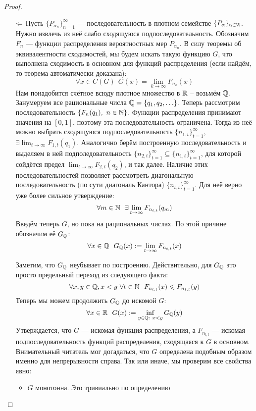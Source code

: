 \begin{proof}
\begin{itemize}
        \item[$\Leftarrow$] Пусть $\{P_{\alpha_n}\}_{n = 1}^\infty$ --- последовательность в плотном семействе $\{P_\alpha\}_{\alpha \in \mathfrak{A}}$. Нужно извлечь из неё слабо сходящуюся подпоследовательность. Обозначим $F_n$ --- функции распределения вероятностных мер $P_{\alpha_n}$. В силу теоремы об эквивалентности сходимостей, мы будем искать такую функцию $G$, что выполнена сходимость в основном для функций распределения (если найдём, то теорема автоматически доказана):
        \[
            \forall x \in C(G)\ \ G(x) = \lim_{k \to \infty} F_{n_k}(x)
        \]
        Нам понадобится счётное всюду плотное множество в $\mathbb{R}$ -- возьмём $\mathbb{Q}$. Занумеруем все рациональные числа $\mathbb{Q} = \{q_1, q_2, \ldots\}$. Теперь рассмотрим последовательность $\{F_n(q_1),\ n \in \mathbb{N}\}$. Функции распределения принимают значения на $[0, 1]$, поэтому эта последовательность ограничена. Тогда из неё можно выбрать сходящуюся подпоследовательность $\{n_{1, t}\}_{t = 1}^\infty$, $\exists \lim_{t \to \infty} F_{1, t}(q_1)$. Аналогично берём построенную последовательность и выделяем в ней подполедовательность $\{n_{2, t}\}_{t = 1}^\infty \subseteq \{n_{1, t}\}_{t = 1}^\infty$, для которой сойдётся предел $\lim_{t \to \infty} F_{2, t}(q_2)$, и так далее. Наличие этих последовательностей позволяет рассмотреть диагональную последовательность (по сути диагональ Кантора) $\{n_{t, t}\}_{t = 1}^\infty$. Для неё верно уже более сильное утверждение:
        \[
        	\forall m \in \mathbb{N}\ \ \exists \lim_{t \to \infty} F_{n_{t, t}}(q_m)
        \]
        Введём теперь $G$, но пока на рациональных числах. По этой причине обозначим её $G_{\mathbb{Q}}$:
        \[
            \forall x \in \mathbb{Q}\ \ G_{\mathbb{Q}}(x) := \lim_{t \to \infty} F_{n_{t, t}}(x)
        \]

        Заметим, что $G_{\mathbb{Q}}$ неубывает по построению. Действительно, для $G_{\mathbb{Q}}$ это просто предельный переход из следующего факта:
        \[
        	\forall x, y \in \Q, x < y\ \forall t \in \N\ \ F_{n_{t, t}}(x) \le F_{n_{t, t}}(y)
        \]
		Теперь мы можем продолжить $G_{\mathbb{Q}}$ до искомой $G$:
        \[
            \forall x \in \mathbb{R}\ \ G(x) := \inf_{y \in \mathbb{Q} \colon x < y} G_{\mathbb{Q}}(y)
        \]
        Утверждается, что $G$ --- искомая функция распределения, а $F_{n_{t, t}}$ --- искомая подпоследовательность функций распределения, сходящаяся к $G$ в основном. Внимательный читатель мог догадаться, что $G$ определена подобным образом именно для непрерывности справа. Так или иначе, мы проверим все свойства явно:
        \begin{itemize}
        	\item $G$ монотонна. Это тривиально по определению
        	

\end{itemize}
\end{itemize}
\end{proof}
